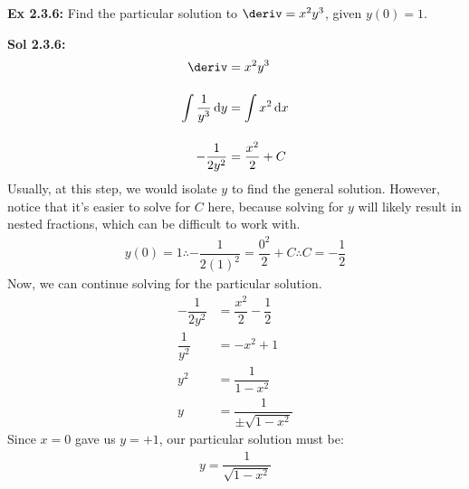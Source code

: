 \begin{tcolorbox}[example]
    \textbf{Ex 2.3.6: } Find the particular solution to $\deriv = x^2y^3$, given $y(0) = 1$.
\end{tcolorbox}
\begin{tcolorbox}[solution]
    \textbf{Sol 2.3.6: } \begin{align*}
        \deriv &= x^2y^3 \\[11pt]
        \int \dfrac{1}{y^3} \,\mathrm{d}y &= \int x^2 \,\mathrm{d}x \\[11pt]
        -\dfrac{1}{2y^2} &= \dfrac{x^2}{2} + C
    \end{align*}
    Usually, at this step, we would isolate $y$ to find the general solution. However, notice that it's easier to solve for $C$ here, because solving for $y$ will likely result in nested fractions, which can be difficult to work with. \begin{align*}
        y(0) = 1 \therefore -\dfrac{1}{2(1)^2} = \dfrac{0^2}{2} + C \therefore C = -\dfrac{1}{2}
    \end{align*}
    Now, we can continue solving for the particular solution. \begin{align*}
        -\dfrac{1}{2y^2} &= \dfrac{x^2}{2} - \dfrac{1}{2} \\[11pt]
        \dfrac{1}{y^2} &= -x^2 + 1 \\[11pt]
        y^2 &= \dfrac{1}{1 - x^2} \\[11pt]
        y &= \dfrac{1}{\pm\sqrt{1 - x^2}}
    \end{align*}
    Since $x = 0$ gave us $y = +1$, our particular solution must be: \begin{align*}
        \boxed{y = \dfrac{1}{\sqrt{1 - x^2}}}
    \end{align*}
\end{tcolorbox} \vspace{11pt}


